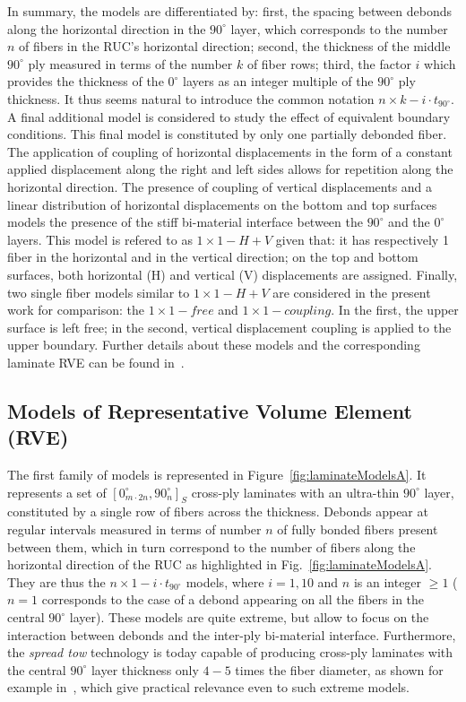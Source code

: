 \documentclass[review]{elsarticle}
\begin{document}
In summary, the models are differentiated by: first, the spacing between debonds along the horizontal direction in the $90^{\circ}$ layer, which corresponds to the number $n$ of fibers in the RUC's horizontal direction; second, the thickness of the middle $90^{\circ}$ ply measured in terms of the number $k$ of fiber rows; third, the factor $i$ which provides the thickness of the $0^{\circ}$ layers as an integer multiple of the $90^{\circ}$ ply thickness.  It thus seems natural to introduce the common notation $n\times k-i\cdot t_{90^{\circ}}$. A final additional model is considered to study the effect of equivalent boundary conditions. This final model is constituted by only one partially debonded fiber. The application of coupling of horizontal displacements in the form of a constant applied displacement along the right and left sides allows for repetition along the horizontal direction. The presence of coupling of vertical displacements and a linear distribution of horizontal displacements on the bottom and top surfaces models the presence of the stiff bi-material interface between the $90^{\circ}$ and the $0^{\circ}$ layers. This model is refered to as $1\times 1-H+V$ given that: it has respectively 1 fiber in the horizontal and in the vertical direction; on the top and bottom surfaces, both horizontal (H) and vertical (V) displacements are assigned. Finally, two single fiber models similar to  $1\times 1-H+V$ are considered in the present work for comparison: the  $1\times 1-free$ and  $1\times 1-coupling$. In the first, the upper surface is left free; in the second, vertical displacement coupling is applied to the upper boundary. Further details about these models and the corresponding laminate RVE can be found in~\cite{DiStasio2019}.


\subsection{Models of Representative Volume Element (RVE)}\label{subsec:rve}

The first family of models is represented in Figure~\ref{fig:laminateModelsA}. It represents a set of $\left[0_{m\cdot2n}^{\circ},90_{n}^{\circ}\right]_{S}$ cross-ply laminates with an ultra-thin $90^{\circ}$ layer, constituted by a single row of fibers across the thickness. Debonds appear at regular intervals measured in terms of number $n$ of fully bonded fibers present between them, which in turn correspond to the number of fibers along the horizontal direction of the RUC as highlighted in Fig.~\ref{fig:laminateModelsA}. They are thus the $n\times1-i\cdot t_{90^{\circ}}$ models, where $i=1,10$ and $n$ is an integer $\geq1$ ($n=1$ corresponds to the case of a debond appearing on all the fibers in the central $90^{\circ}$ layer). These models are quite extreme, but allow to focus on the interaction between debonds and the inter-ply bi-material interface. Furthermore, the \emph{spread tow} technology is today capable of producing cross-ply laminates with the central $90^{\circ}$ layer thickness only $4-5$ times the fiber diameter, as shown for example in~\cite{Saito2012}, which give practical relevance even to such extreme models.  
\end{document}
